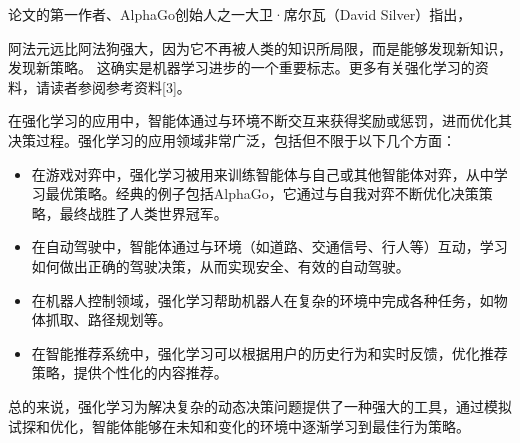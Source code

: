 论文的第一作者、AlphaGo创始人之一大卫·席尔瓦（David Silver）指出，

阿法元远比阿法狗强大，因为它不再被人类的知识所局限，而是能够发现新知识，发现新策略。
这确实是机器学习进步的一个重要标志。更多有关强化学习的资料，请读者参阅参考资料[3]。

在强化学习的应用中，智能体通过与环境不断交互来获得奖励或惩罚，进而优化其决策过程。强化学习的应用领域非常广泛，包括但不限于以下几个方面：
\begin{itemize}
\item 在游戏对弈中，强化学习被用来训练智能体与自己或其他智能体对弈，从中学习最优策略。经典的例子包括AlphaGo，它通过与自我对弈不断优化决策策略，最终战胜了人类世界冠军。
\item 在自动驾驶中，智能体通过与环境（如道路、交通信号、行人等）互动，学习如何做出正确的驾驶决策，从而实现安全、有效的自动驾驶。
\item 在机器人控制领域，强化学习帮助机器人在复杂的环境中完成各种任务，如物体抓取、路径规划等。
\item 在智能推荐系统中，强化学习可以根据用户的历史行为和实时反馈，优化推荐策略，提供个性化的内容推荐。
\end{itemize}

总的来说，强化学习为解决复杂的动态决策问题提供了一种强大的工具，通过模拟试探和优化，智能体能够在未知和变化的环境中逐渐学习到最佳行为策略。


\newpage